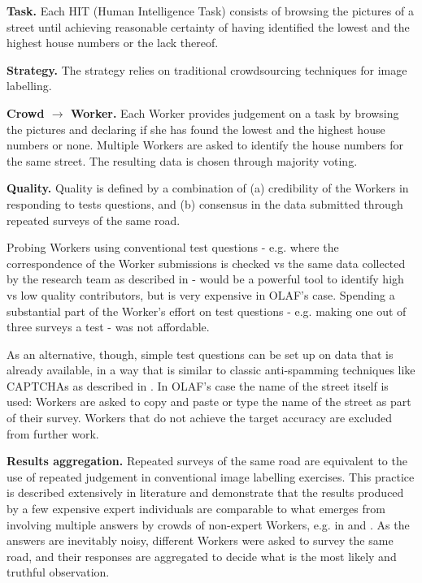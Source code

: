 \textbf{Task.} Each HIT (Human Intelligence Task) consists of browsing the pictures of a street until achieving reasonable certainty of having identified the lowest and the highest house numbers or the lack thereof.

\textbf{Strategy.} The strategy relies on traditional crowdsourcing techniques for image labelling.

\textbf{Crowd $\rightarrow$ Worker.} Each Worker provides judgement on a task by browsing the pictures and declaring if she has found the lowest and the highest house numbers or none. Multiple Workers are asked to identify the house numbers for the same street. The resulting data is chosen through majority voting.

\textbf{Quality.} Quality is defined by a combination of (a) credibility of the Workers in responding to tests questions, and (b) consensus in the data submitted through repeated surveys of the same road.

Probing Workers using conventional test questions - e.g. where the correspondence of the Worker submissions is checked vs the same data collected by the research team as described in \cite{Kittur:2008gj} - would be a powerful tool to identify high vs low quality contributors, but is very expensive in OLAF's case. Spending a substantial part of the Worker's effort on test questions - e.g. making one out of three surveys a test - was not affordable.

As an alternative, though, simple test questions can be set up on data that is already available, in a way that is similar to classic anti-spamming techniques like CAPTCHAs as described in \cite{Difallah:2012ty}. In OLAF's case the name of the street itself is used: Workers are asked to copy and paste or type the name of the street as part of their survey. Workers that do not achieve the target accuracy are excluded from further work.

\textbf{Results aggregation.} Repeated surveys of the same road are equivalent to the use of repeated judgement in conventional image labelling exercises. This practice is described extensively in literature and demonstrate that the results produced by a few expensive expert individuals are comparable to what emerges from involving multiple answers by crowds of non-expert Workers, e.g. in \cite{Snow:2008wo} and \cite{Sheng:2008gra}. As the answers are inevitably noisy, different Workers were asked to survey the same road, and their responses are aggregated to decide what is the most likely and truthful observation. 
        
